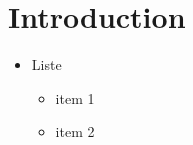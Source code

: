 \documentclass[11pt]{article}
\begin{document}
\clearpage
\section{Introduction}


\begin{itemize}[leftmargin=0cm,label={}]
\item Liste
\begin{itemize}
\item item 1
\item item 2
\end{itemize}
\end{itemize}
\end{document}
